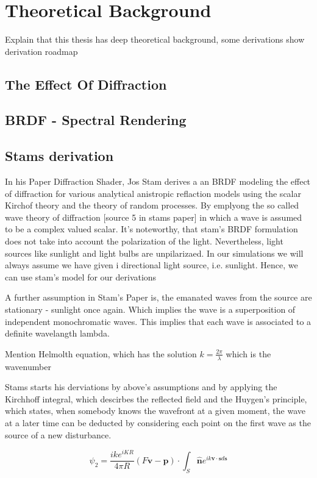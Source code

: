\section{Theoretical Background}
Explain that this thesis has deep theoretical background, some derivations
show derivation roadmap
\subsection{The Effect Of Diffraction}

\subsection{BRDF - Spectral Rendering}

\subsection{Stams derivation}

In his Paper Diffraction Shader, Jos Stam derives a an BRDF modeling the effect of diffraction for various analytical anistropic reflaction models using the scalar Kirchof theory and the theory of random processes. By emplyong the so called wave theory of diffraction [source 5 in stams paper] in which a wave is assumed to be a complex valued scalar. It's noteworthy, that stam's BRDF formulation does not take into account the polarization of the light. Nevertheless, light sources like sunlight and light bulbs are unpilarizaed. In our simulations we will always assume we have given i directional light source, i.e. sunlight. Hence, we can use stam's model for our derivations

A further assumption in Stam's Paper is, the emanated waves from the source are stationary - sunlight once again.
Which implies the wave is a superposition of independent monochromatic waves. This implies that each wave is associated to a definite wavelangth lambda.

Mention Helmolth equation, which has the solution $k = \frac{2\pi}{\lambda}$ which is the wavenumber

Stams starts his derviations by above's assumptions and by applying the Kirchhoff integral, which descirbes the reflected field and the Huygen's principle, which states, when somebody knows the wavefront at a given moment, the wave at a later time can be deducted by considering each point on the first wave as the source of a new disturbance.

\begin{equation}
  \psi_2 = \frac{i k e^{i K R}}{4 \pi R}(F\mathbf{v}-\mathbf{p}) \cdot \int_{S} \hat{\mathbf{n}} e^{ik\mathbf{v} \cdot \mathbf{s} d\mathbf{s}}
\end{equation}


